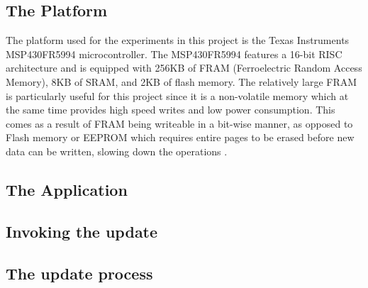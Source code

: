 \subsection{The Platform}
The platform used for the experiments in this project is the Texas Instruments MSP430FR5994 microcontroller. The MSP430FR5994 features a 16-bit RISC architecture and is equipped with 256KB of FRAM (Ferroelectric Random Access Memory), 8KB of SRAM, and 2KB of flash memory. The relatively large FRAM is particularly useful for this project since it is a non-volatile memory which at the same time provides high speed writes and low power consumption. This comes as a result of FRAM being writeable in a bit-wise manner, as opposed to Flash memory or EEPROM which requires entire pages to be erased before new data can be written, slowing down the operations \cite{framReport}.
\subsection{The Application}
\subsection{Invoking the update}
\subsection{The update process}
